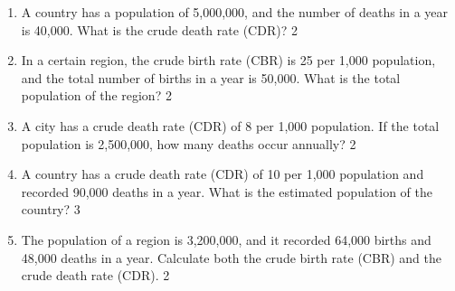 \documentclass[a4paper,oneside]{book}
\begin{document}
\begin{enumerate}
 \item A country has a population of 5,000,000, and the number of deaths in a year is 40,000. What is the crude death rate (CDR)? \hfill 2  

\item In a certain region, the crude birth rate (CBR) is 25 per 1,000 population, and the total number of births in a year is 50,000. What is the total population of the region? \hfill 2

\item A city has a crude death rate (CDR) of 8 per 1,000 population. If the total population is 2,500,000, how many deaths occur annually? \hfill 2  

\item A country has a crude death rate (CDR) of 10 per 1,000 population and recorded 90,000 deaths in a year. What is the estimated population of the country? \hfill 3  

\item The population of a region is 3,200,000, and it recorded 64,000 births and 48,000 deaths in a year. Calculate both the crude birth rate (CBR) and the crude death rate (CDR). \hfill 2


  
    \end{enumerate}
\end{document}
